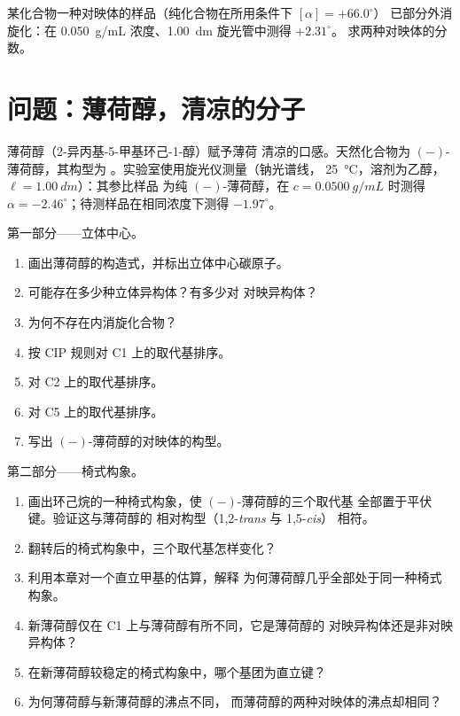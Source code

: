 \begin{exercise}[$\star\star\star$]\label{exo:b1:stereochemistry-in-depth:12}
某化合物一种对映体的样品（纯化合物在所用条件下 $[\alpha] = +66.0^\circ$）
已部分外消旋化：在
\qty{0.050}{g/mL} 浓度、\qty{1.00}{dm} 旋光管中测得 $+2.31^\circ$。
求两种对映体的分数。
\end{exercise}

\section{问题：薄荷醇，清凉的分子}

\begin{problem}
\label{pb:b1:stereochemistry-in-depth:1}
薄荷醇（2-异丙基-5-甲基环己-1-醇）赋予薄荷
清凉的口感。天然化合物为 $(-)$-薄荷醇，其构型为
。实验室使用旋光仪测量（钠光谱线，
\qty{25}{\celsius}，溶剂为乙醇，$\ell = \qty{1.00}{dm}$）：其参比样品
为纯 $(-)$-薄荷醇，在 $c = \qty{0.0500}{g/mL}$ 时测得 $\alpha =
-2.46^\circ$；待测样品在相同浓度下测得
$-1.97^\circ$。

\medskip
第一部分——立体中心。
\begin{enumerate}
  \item 画出薄荷醇的构造式，并标出立体中心碳原子。
  \item 可能存在多少种立体异构体？有多少对
        对映异构体？
  \item 为何不存在内消旋化合物？
  \item 按 CIP 规则对 C1 上的取代基排序。
  \item 对 C2 上的取代基排序。
  \item 对 C5 上的取代基排序。
  \item 写出 $(-)$-薄荷醇的对映体的构型。
\end{enumerate}

\medskip
第二部分——椅式构象。
\begin{enumerate}[resume]
  \item 画出环己烷的一种椅式构象，使 $(-)$-薄荷醇的三个取代基
        全部置于平伏键。验证这与薄荷醇的
        相对构型（1,2-\textit{trans} 与 1,5-\textit{cis}）
        相符。
  \item 翻转后的椅式构象中，三个取代基怎样变化？
  \item 利用本章对一个直立甲基的估算，解释
        为何薄荷醇几乎全部处于同一种椅式构象。
  \item 新薄荷醇仅在 C1 上与薄荷醇有所不同，它是薄荷醇的
        对映异构体还是非对映异构体？
  \item 在新薄荷醇较稳定的椅式构象中，哪个基团为直立键？
  \item 为何薄荷醇与新薄荷醇的沸点不同，
        而薄荷醇的两种对映体的沸点却相同？
\end{enumerate}


\end{problem}
